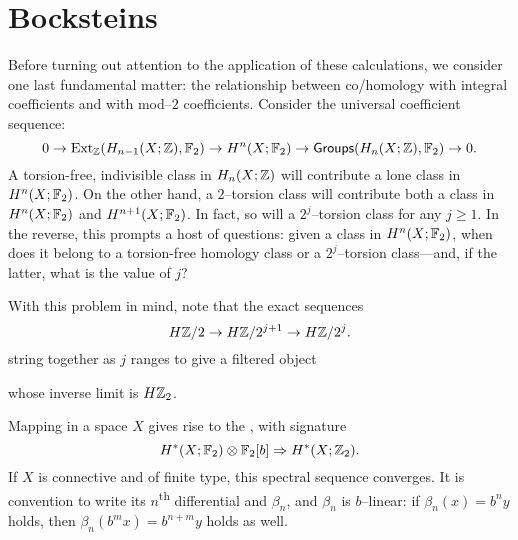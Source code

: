 \section{Bocksteins}


Before turning out attention to the application of these calculations, we consider one last fundamental matter: the relationship between co/homology with integral coefficients and with mod--$2$ coefficients.
Consider the universal coefficient sequence: \[0 \to \operatorname{Ext}_{\mathbb Z}(H_{n-1}(X; \mathbb Z), \mathbb F_2) \to H^n(X; \mathbb F_2) \to \mathsf{Groups}(H_n(X; \mathbb Z), \mathbb F_2) \to 0.\]
A torsion-free, indivisible class in $H_n(X; \mathbb Z)$ will contribute a lone class in $H^n(X; \mathbb F_2)$.
On the other hand, a $2$--torsion class will contribute both a class in $H^n(X; \mathbb F_2)$ and $H^{n+1}(X; \mathbb F_2)$.
In fact, so will a $2^j$--torsion class for any $j \ge 1$.
In the reverse, this prompts a host of questions: given a class in $H^n(X; \mathbb F_2)$, when does it belong to a torsion-free homology class or a $2^j$--torsion class---and, if the latter, what is the value of $j$?

With this problem in mind, note that the exact sequences \[H\mathbb Z/2 \to H\mathbb Z/2^{j+1} \to H\mathbb Z/2^j.\]
string together as $j$ ranges to give a filtered object
\begin{center}
\end{center}
whose inverse limit is $H\mathbb Z_2$.

\begin{definition}
Mapping in a space $X$ gives rise to the , with signature \[H^*(X; \mathbb F_2) \otimes \mathbb F_2[b] \Rightarrow H^*(X; \mathbb Z_2).\]
If $X$ is connective and of finite type, this spectral sequence converges.  It is convention to write its $n$\textsuperscript{th} differential and $\beta_n$, and $\beta_n$ is $b$--linear: if $\beta_n(x) = b^n y$ holds, then $\beta_n(b^m x) = b^{n+m} y$ holds as well.
\end{definition}

